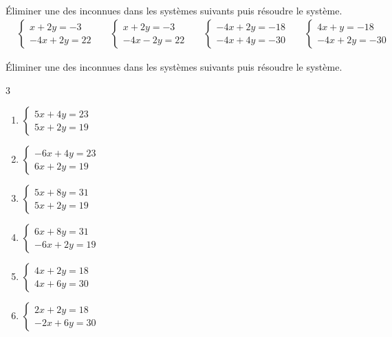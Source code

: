 \documentclass[main.tex]{subfiles}
\begin{document}
%	 
\begin{example}\hfill  \\
	Éliminer une des inconnues dans les systèmes suivants puis résoudre le système.\vspace{-1em}
	\begin{align*}
		&\begin{cases}
			x + 2y = -3\\
			-4x + 2y= 22
		\end{cases} 
		&&  
		\begin{cases}
			x + 2y = -3\\
			-4x - 2y= 22
		\end{cases}
		&&
		\begin{cases}
			-4x + 2y = -18\\
			-4x + 4y=-30
		\end{cases}
		&&
		\begin{cases}
			4x + y = -18\\
			-4x + 2y=-30
		\end{cases}
	\end{align*}
\end{example}
\begin{exercise} 
	Éliminer une des inconnues dans les systèmes suivants puis résoudre le système.\vspace{-1em} 
	\begin{multicols}{3} 
		\begin{enumerate}[leftmargin =*,label={$S_\arabic*$}] 
			\item $\begin{cases}
				5x + 4y = 23 \\5x + 2y = 19 
			\end{cases}$
			\item $\begin{cases}
				-6x + 4y = 23 \\6x +2y = 19
			\end{cases}$
			\item $\begin{cases}
				5x +8y = 31 \\5x + 2y = 19
			\end{cases}$
			\item $\begin{cases}
				6x +8y = 31 \\-6x +2y = 19
			\end{cases}$
			\item $\begin{cases}
				4x +2y = 18 \\4x + 6y = 30
			\end{cases}$
			\item $\begin{cases}
				2x +2y = 18 \\-2x + 6y = 30
			\end{cases}$
		\end{enumerate}  
	\end{multicols} 
\end{exercise}
\end{document}

